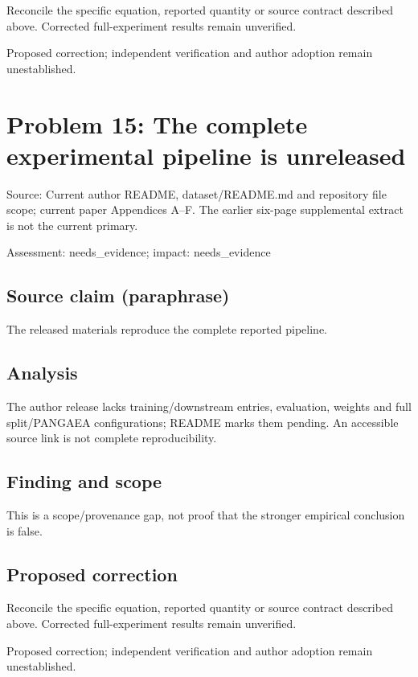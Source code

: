 \documentclass[11pt]{article}
\begin{document}
Reconcile the specific equation, reported quantity or source contract described above. Corrected full-experiment results remain unverified.

Proposed correction; independent verification and author adoption remain unestablished.

\section*{Problem 15: The complete experimental pipeline is unreleased}

Source: Current author README, dataset/README.md and repository file scope; current paper Appendices A–F. The earlier six-page supplemental extract is not the current primary.

Assessment: needs\_evidence; impact: needs\_evidence

\subsection*{Source claim (paraphrase)}

The released materials reproduce the complete reported pipeline.

\subsection*{Analysis}

The author release lacks training/downstream entries, evaluation, weights and full split/PANGAEA configurations; README marks them pending. An accessible source link is not complete reproducibility.

\subsection*{Finding and scope}

This is a scope/provenance gap, not proof that the stronger empirical conclusion is false.

\subsection*{Proposed correction}

Reconcile the specific equation, reported quantity or source contract described above. Corrected full-experiment results remain unverified.

Proposed correction; independent verification and author adoption remain unestablished.
\end{document}
